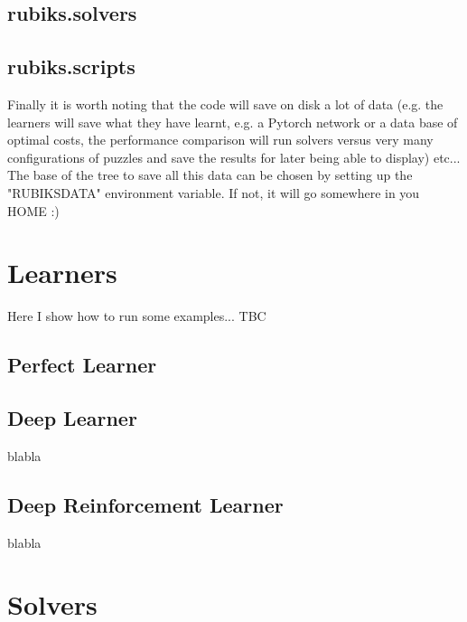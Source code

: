 \subsection{rubiks.solvers}

\subsection{rubiks.scripts}


Finally it is worth noting that the code will save on disk a lot of data (e.g. the learners will save what they have learnt, e.g. a Pytorch network or a data base of optimal costs, the performance comparison will run solvers versus very many configurations of puzzles and save the results for later being able to display) etc... The base of the tree to save all this data can be chosen by setting up the "RUBIKSDATA" environment variable. If not, it will go somewhere in you HOME :)


\section{Learners}

Here I show how to run some examples... TBC

\subsection{Perfect Learner}
\label{PLSS}


\subsection{Deep Learner}
\label{DLSS}
blabla

\subsection{Deep Reinforcement Learner}
\label{DRLSS}

blabla


\section{Solvers}

